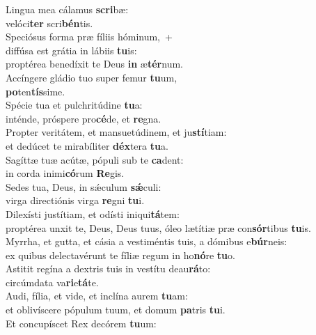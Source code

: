 \evenverse Lingua mea cálamus \textbf{scri}bæ:~\*\\
\evenverse velóci\textbf{ter} scri\textbf{bén}tis.\\
\oddverse Speciósus forma præ fíliis hóminum,~+\\
\oddverse  diffúsa est grátia in lábiis \textbf{tu}is:~\*\\
\oddverse proptérea benedíxit te Deus \textbf{in} æ\textbf{tér}num.\\
\evenverse Accíngere gládio tuo super femur \textbf{tu}um,~\*\\
\evenverse \textbf{po}ten\textbf{tís}sime.\\
\oddverse Spécie tua et pulchritúdine \textbf{tu}a:~\*\\
\oddverse inténde, próspere pro\textbf{cé}de, et \textbf{re}gna.\\
\evenverse Propter veritátem, et mansuetúdinem, et ju\textbf{stí}tiam:~\*\\
\evenverse et dedúcet te mirabíliter \textbf{déx}tera \textbf{tu}a.\\
\oddverse Sagíttæ tuæ acútæ, pópuli sub te \textbf{ca}dent:~\*\\
\oddverse in corda inimi\textbf{có}rum \textbf{Re}gis.\\
\evenverse Sedes tua, Deus, in sǽculum \textbf{sǽ}culi:~\*\\
\evenverse virga directiónis virga \textbf{re}gni \textbf{tu}i.\\
\oddverse Dilexísti justítiam, et odísti iniqui\textbf{tá}tem:~\*\\
\oddverse proptérea unxit te, Deus, Deus tuus, óleo lætítiæ præ con\textbf{sór}tibus \textbf{tu}is.\\
\evenverse Myrrha, et gutta, et cásia a vestiméntis tuis, a dómibus e\textbf{búr}neis:~\*\\
\evenverse ex quibus delectavérunt te fíliæ regum in ho\textbf{nó}re \textbf{tu}o.\\
\oddverse Astitit regína a dextris tuis in vestítu deau\textbf{rá}to:~\*\\
\oddverse circúmdata va\textbf{ri}e\textbf{tá}te.\\
\evenverse Audi, fília, et vide, et inclína aurem \textbf{tu}am:~\*\\
\evenverse et oblivíscere pópulum tuum, et domum \textbf{pa}tris \textbf{tu}i.\\
\oddverse Et concupíscet Rex decórem \textbf{tu}um:~\*\\
